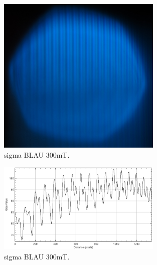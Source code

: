 \begin{figure}
  \centering
  \includegraphics[width=0.7\textwidth]{bilder/3009_BLAU_1100mT_pi.jpg}
  \caption{sigma BLAU 300mT.}
  \label{abb:piblau1100mT}
\end{figure}
\begin{figure}
  \centering
  \includegraphics[width=0.7\textwidth]{bilder/pi_BLAU_1100mT.PNG}
  \caption{sigma BLAU 300mT.}
  \label{abb:plotpiblau1100mT}
\end{figure}
